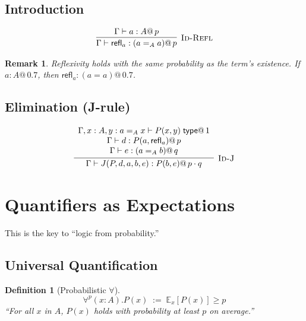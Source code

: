 \documentclass[11pt,a4paper]{article}
\makeatletter
\newtheorem{definition}{Definition}[section]
\newtheorem{remark}{Remark}[section]
\newcommand{\type}{\;\mathsf{type}}
\newcommand{\E}{\mathbb{E}}
\newcommand{\pmark}[1]{@\, #1}  %
\makeatother
\begin{document}
\subsection{Introduction}

\begin{gather}
\infer[\textsc{Id-Refl}]
  {\Gamma \vdash \mathsf{refl}_a : (a =_A a) \pmark{p}}
  {\Gamma \vdash a : A \pmark{p}}
\end{gather}

\begin{remark}
Reflexivity holds with the same probability as the term's existence. If $a : A \pmark{0.7}$, then $\mathsf{refl}_a : (a = a) \pmark{0.7}$.
\end{remark}

\subsection{Elimination (J-rule)}

\begin{gather}
\infer[\textsc{Id-J}]
  {\Gamma \vdash J(P, d, a, b, e) : P(b, e) \pmark{p \cdot q}}
  {\begin{array}{c}
    \Gamma, x : A, y : a =_A x \vdash P(x, y) \type \pmark{1} \\
    \Gamma \vdash d : P(a, \mathsf{refl}_a) \pmark{p} \\
    \Gamma \vdash e : (a =_A b) \pmark{q}
  \end{array}}
\end{gather}

\section{Quantifiers as Expectations}

This is the key to ``logic from probability.''

\subsection{Universal Quantification}

\begin{definition}[Probabilistic $\forall$]
\[
\forall^p (x : A). P(x) \;:=\; \E_x[P(x)] \geq p
\]
``For all $x$ in $A$, $P(x)$ holds with probability at least $p$ on average.''
\end{definition}
\end{document}
